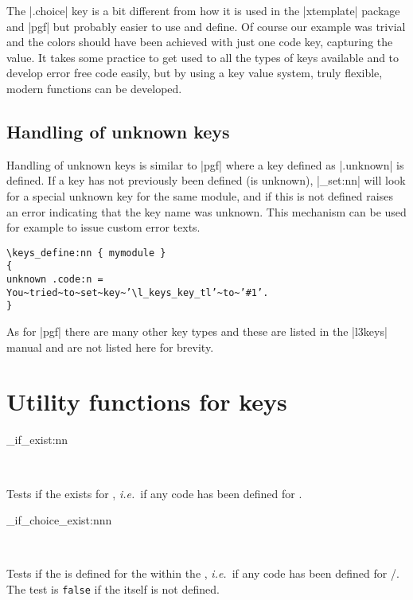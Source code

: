 The |.choice|  key is a bit different from how it is used in the |xtemplate| package and |pgf| but probably easier to use and define. Of course our example was trivial and the colors should have been achieved with just one code key, capturing the value. It takes some practice to get used to all the types of keys available and to develop error free code easily, but by using a key value system, truly flexible, modern functions can be developed.
 

\subsection{Handling of unknown keys}
 
 Handling of unknown keys is similar to |pgf| where a key defined as |.unknown| is defined. 
 If a key has not previously been defined (is unknown), |\keys_set:nn| will look for a special
unknown key for the same module, and if this is not defined raises an error indicating that
the key name was unknown. This mechanism can be used for example to issue custom
error texts.

\begin{verbatim}
\keys_define:nn { mymodule }
{
unknown .code:n =
You~tried~to~set~key~’\l_keys_key_tl’~to~’#1’.
}
\end{verbatim}
 
 
 As for |pgf| there are many other key types and these are listed in the |l3keys| manual and are not listed here for brevity. 
 
 
 \section{Utility functions for keys}

 \begin{function}[EXP, pTF, updated = 2017-11-14]{\keys_if_exist:nn}
   \begin{syntax}
        \\
         
   \end{syntax}
   Tests if the  exists for , \emph{i.e.}~if any code
   has been defined for .
 \end{function}

 \begin{function}[EXP,pTF, updated = 2017-11-14]
   {\keys_if_choice_exist:nnn}
   \begin{syntax}
         \\
          
   \end{syntax}
   Tests if the  is defined for the  within the
   , \emph{i.e.}~if any code has been defined for
   /. The test is \texttt{false} if the 
   itself is not defined.
 \end{function}

